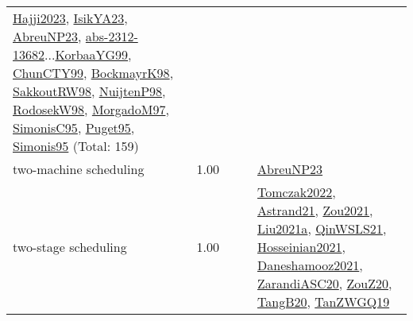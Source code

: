 {\begin{longtable}{p{3cm}r>{\raggedright\arraybackslash}p{6cm}>{\raggedright\arraybackslash}p{6cm}>{\raggedright\arraybackslash}p{8cm}}
\hyperref[detail:Hajji2023]{Hajji2023}, \hyperref[detail:IsikYA23]{IsikYA23}, \hyperref[detail:AbreuNP23]{AbreuNP23}, \hyperref[detail:abs-2312-13682]{abs-2312-13682}...\hyperref[detail:KorbaaYG99]{KorbaaYG99}, \hyperref[detail:ChunCTY99]{ChunCTY99}, \hyperref[detail:BockmayrK98]{BockmayrK98}, \hyperref[detail:SakkoutRW98]{SakkoutRW98}, \hyperref[detail:NuijtenP98]{NuijtenP98}, \hyperref[detail:RodosekW98]{RodosekW98}, \hyperref[detail:MorgadoM97]{MorgadoM97}, \hyperref[detail:SimonisC95]{SimonisC95}, \hyperref[detail:Puget95]{Puget95}, \hyperref[detail:Simonis95]{Simonis95} (Total: 159)\\
\index{two-machine scheduling}\index{Concepts!two-machine scheduling}two-machine scheduling &  1.00 &  &  & \hyperref[detail:AbreuNP23]{AbreuNP23}\\
\index{two-stage scheduling}\index{Concepts!two-stage scheduling}two-stage scheduling &  1.00 &  &  & \hyperref[detail:Tomczak2022]{Tomczak2022}, \hyperref[detail:Astrand21]{Astrand21}, \hyperref[detail:Zou2021]{Zou2021}, \hyperref[detail:Liu2021a]{Liu2021a}, \hyperref[detail:QinWSLS21]{QinWSLS21}, \hyperref[detail:Hosseinian2021]{Hosseinian2021}, \hyperref[detail:Daneshamooz2021]{Daneshamooz2021}, \hyperref[detail:ZarandiASC20]{ZarandiASC20}, \hyperref[detail:ZouZ20]{ZouZ20}, \hyperref[detail:TangB20]{TangB20}, \hyperref[detail:TanZWGQ19]{TanZWGQ19}\\

\end{longtable}}
